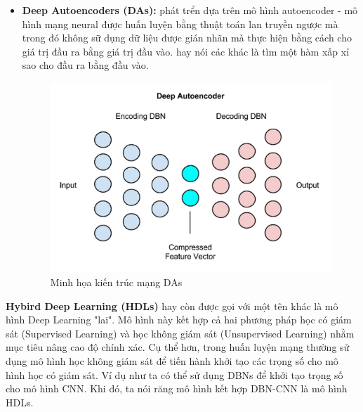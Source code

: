\begin{itemize}
	\item \textbf{Deep Autoencoders (DAs): } phát trển dựa trên mô  hình autoencoder - mô hình mạng neural được huấn luyện bằng thuật toán lan truyền ngược mà trong đó không sữ dụng dữ liệu được gián nhãn mà thực hiện bằng cách cho giá trị đầu ra bằng giá trị đầu vào. hay nói các khác là tìm một hàm xấp xỉ sao cho đầu ra bằng đầu vào.
\begin{figure}[t]
  			\begin{center}
    				\includegraphics[scale=0.8]{DAs}
    				\caption[Caption for LOF]{Minh họa kiến trúc mạng DAs\protect\footnotemark} 
    				\label{CNN_chu}
  			\end{center}
\end{figure}		
\end{itemize}

\textbf{Hybird Deep Learning (HDLs)} hay còn được gọi với một tên khác là mô hình Deep Learning "lai". Mô hình này kết hợp cả hai phương pháp học có giám sát (Supervised Learning) và học không giám sát (Unsupervised Learning) nhằm mục tiêu nâng cao độ chính xác. Cụ thể hơn, trong huấn luyện mạng thường sử dụng mô hình học không giám sát để tiến hành khởi tạo các trọng số cho mô hình học có giám sát. Ví dụ như ta có thể sử dụng DBNs để khởi tạo trọng số cho mô hình CNN. Khi đó, ta nói răng mô hình kết hợp DBN-CNN là mô hình HDLs. 
 

